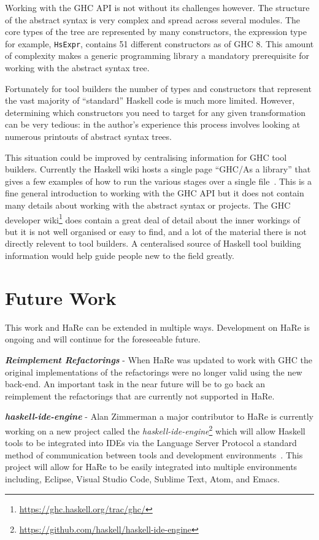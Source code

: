 Working with the GHC API is not without its challenges however. The structure of the abstract syntax is very complex and spread across several modules. The core types of the tree are represented by many constructors, the expression type for example, \texttt{HsExpr}, contains 51 different constructors as of GHC 8. This amount of complexity makes a generic programming library a mandatory prerequisite for working with the abstract syntax tree. 

Fortunately for tool builders the number of types and constructors that represent the vast majority of ``standard'' Haskell code is much more limited. However, determining which constructors you need to target for any given transformation can be very tedious: in the author's experience this process involves looking at numerous printouts of abstract syntax trees. 

This situation could be improved by centralising information for GHC tool builders. Currently the Haskell wiki hosts a single page ``GHC/As a library'' that gives a few examples of how to run the various stages over a single file~\citep{ghcAsALibrary}. This is a fine general introduction to working with the GHC API but it does not contain many details about working with the abstract syntax or projects. The GHC developer wiki\footnote{\url{https://ghc.haskell.org/trac/ghc/}} does contain a great deal of detail about the inner workings of but it is not well organised or easy to find, and a lot of the material there is not directly relevent to tool builders. A centeralised source of Haskell tool building information would help guide people new to the field greatly.

\section{Future Work}
This work and HaRe can be extended in multiple ways. Development on HaRe is ongoing and will continue for the foreseeable future. 

\textit{\textbf{Reimplement Refactorings}} - When HaRe was updated to work with GHC the original implementations of the refactorings were no longer valid using the new back-end. An important task in the near future will be to go back an reimplement the refactorings that are currently not supported in HaRe.  

\textit{\textbf{haskell-ide-engine}} - Alan Zimmerman a major contributor to HaRe is currently working on a new project called the \textit{haskell-ide-engine}\footnote{\url{https://github.com/haskell/haskell-ide-engine}} which will allow Haskell tools to be integrated into IDEs via the Language Server Protocol a standard method of communication between tools and development environments~\citep{lsp}. This project will allow for HaRe to be easily integrated into multiple environments including, Eclipse, Visual Studio Code, Sublime Text, Atom, and Emacs.

